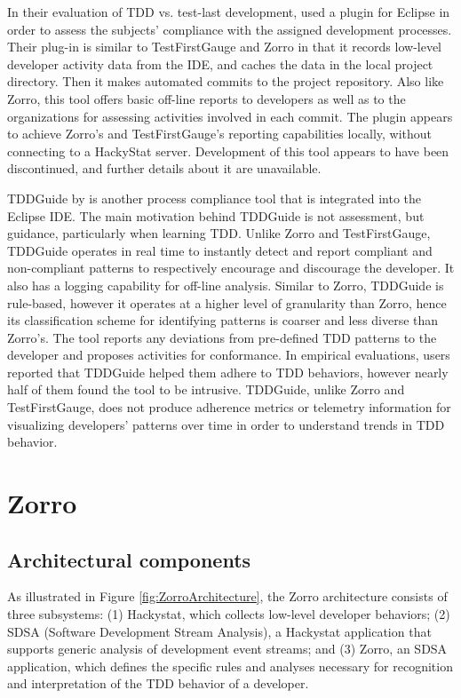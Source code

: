 \documentclass[smallextended]{svjour3}     %
\begin{document}
In their evaluation of TDD vs. test-last development, \cite{Madeyski:07} used a 
plugin for Eclipse in order to assess the subjects' compliance with the assigned development processes. 
Their plug-in is similar to TestFirstGauge and Zorro in that it records low-level developer activity data from the IDE, 
and caches the data in the local project directory. Then it makes automated commits to the project repository. 
Also like Zorro, this tool offers basic off-line reports to developers as well as to the organizations
 for assessing activities involved in each commit. The plugin appears to
 achieve Zorro's and TestFirstGauge's reporting capabilities locally, without connecting 
to a HackyStat server. Development of this tool appears to have been discontinued, 
and further details about it are unavailable.

TDDGuide by \cite{Mishali:08} 
is another process compliance tool that is integrated into the Eclipse IDE.
The main motivation behind TDDGuide is not assessment, but guidance, particularly when learning TDD. 
Unlike Zorro and TestFirstGauge, TDDGuide operates in real time to instantly detect and report compliant and non-compliant
patterns to respectively encourage and discourage the developer. It also has a logging capability for off-line analysis.
Similar to Zorro, TDDGuide is rule-based, however it
operates at a higher level of granularity than Zorro, hence its classification scheme for identifying patterns is coarser 
and less
diverse than Zorro's. The tool reports any 
deviations from pre-defined TDD patterns to the developer and proposes activities for conformance. In empirical evaluations, 
 users reported that TDDGuide helped them adhere to TDD behaviors, however nearly half of them found the tool to 
be intrusive. TDDGuide, unlike Zorro and TestFirstGauge, does not produce adherence metrics or telemetry information for
 visualizing developers' patterns over time in order to understand trends in TDD behavior. 


\section{Zorro}
\label{sec:zorro}

\subsection{Architectural components}

As illustrated in Figure \ref{fig:ZorroArchitecture}, the Zorro
architecture consists of three subsystems: (1) Hackystat, which collects
low-level developer behaviors; (2) SDSA (Software Development Stream
Analysis), a Hackystat application that supports generic analysis of
development event streams; and (3) Zorro, an SDSA application, which
defines the specific rules and analyses necessary for recognition and
interpretation of the TDD behavior of a developer.
\end{document}
